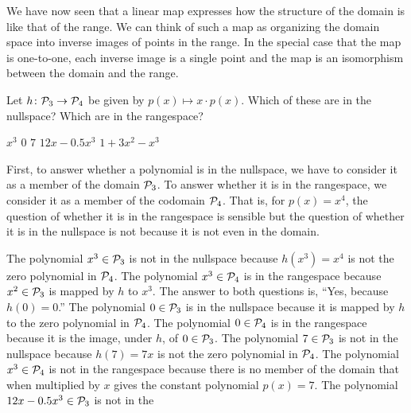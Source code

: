 We have now seen that a linear map
expresses how the structure of the domain is like that of the range.
We can think of such a map as organizing the domain space into
inverse images of points in the range.
In the special case that the map is one-to-one, each inverse image is a single
point and the map is an isomorphism between the domain and the range.


\begin{exercises}
  \recommended \item 
    Let \( \mbox{$h\colon \mathcal{P}_3\to \mathcal{P}_4$} \) be
    given by \( p(x)\mapsto x\cdot p(x) \).
    Which of these are in the nullspace?
    Which are in the rangespace?
    \begin{exparts*}
      \partsitem \( x^3 \)
      \partsitem \( 0 \)
      \partsitem \( 7 \)
      \partsitem \( 12x-0.5x^3 \)
      \partsitem \( 1+3x^2-x^3 \)
    \end{exparts*}
    \begin{answer}
      First, to answer whether a polynomial is in the nullspace, 
      we have to consider it as a member of the domain $\mathcal{P}_3$.
      To answer whether it is in the rangespace, we consider it as a member of
      the codomain $\mathcal{P}_4$.
      That is, for $p(x)=x^4$, the question of whether it is in the rangespace
      is sensible but the question of whether it is in the nullspace is not
      because it is not even in the domain.
      \begin{exparts}
        \partsitem The polynomial $x^3\in\mathcal{P}_3$ is not in the nullspace
            because $h(x^3)=x^4$ is not the zero polynomial in $\mathcal{P}_4$.
            The polynomial $x^3\in\mathcal{P}_4$ is in the rangespace because
            $x^2\in\mathcal{P}_3$ is mapped by $h$ to $x^3$.
        \partsitem The answer to both questions is, ``Yes, because 
            $h(0)=0$.''
            The polynomial $0\in\mathcal{P}_3$ is in the nullspace
            because it is mapped by $h$ to the zero polynomial in 
            $\mathcal{P}_4$.
            The polynomial $0\in\mathcal{P}_4$ is in the rangespace because
            it is the image, under $h$, of $0\in\mathcal{P}_3$.
        \partsitem The polynomial $7\in\mathcal{P}_3$ is not in the nullspace
            because $h(7)=7x$ is not the zero polynomial in $\mathcal{P}_4$.
            The polynomial $x^3\in\mathcal{P}_4$ is not in the rangespace 
            because there is no member of the domain that when multiplied 
            by $x$ gives the constant polynomial $p(x)=7$.
        \partsitem The polynomial $12x-0.5x^3\in\mathcal{P}_3$ is not in the 

\end{exparts}
\end{answer}
\end{exercises}
